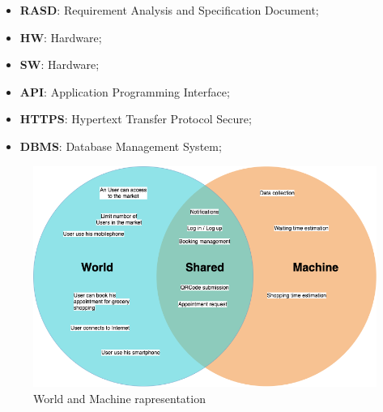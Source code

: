 \begin{itemize}
\subsection{Acronyms}
\item \textbf{RASD}: Requirement Analysis and Specification Document;
\item \textbf{HW}: Hardware;
\item \textbf{SW}: Hardware;
\item \textbf{API}: Application Programming Interface;
\item \textbf{HTTPS}: Hypertext Transfer Protocol Secure;
\item \textbf{DBMS}: Database Management System;

\end{itemize}


\begin{figure}[H]
  \caption{World and Machine rapresentation}
  \label{fig:Reservation}
  \centering
  \includegraphics[scale = 0.38]{diagrams/VENN.png}
\end{figure}


